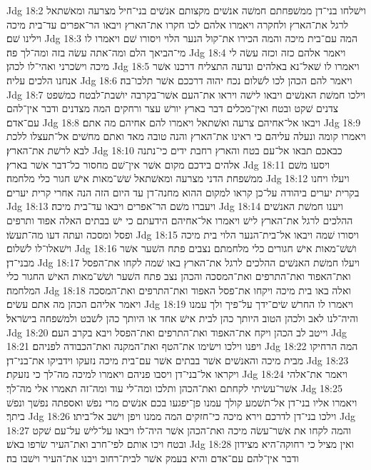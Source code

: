 Jdg 18:2  וישׁלחו בני־דן ממשׁפחתם חמשׁה אנשׁים מקצותם אנשׁים בני־חיל מצרעה ומאשׁתאל לרגל את־הארץ ולחקרה ויאמרו אלהם לכו חקרו את־הארץ ויבאו הר־אפרים עד־בית מיכה וילינו שׁם׃
Jdg 18:3  המה עם־בית מיכה והמה הכירו את־קול הנער הלוי ויסורו שׁם ויאמרו לו מי־הביאך הלם ומה־אתה עשׂה בזה ומה־לך פה׃
Jdg 18:4  ויאמר אלהם כזה וכזה עשׂה לי מיכה וישׂכרני ואהי־לו לכהן׃
Jdg 18:5  ויאמרו לו שׁאל־נא באלהים ונדעה התצליח דרכנו אשׁר אנחנו הלכים עליה׃
Jdg 18:6  ויאמר להם הכהן לכו לשׁלום נכח יהוה דרככם אשׁר תלכו־בה׃
Jdg 18:7  וילכו חמשׁת האנשׁים ויבאו לישׁה ויראו את־העם אשׁר־בקרבה יושׁבת־לבטח כמשׁפט צדנים שׁקט ובטח ואין־מכלים דבר בארץ יורשׁ עצר ורחקים המה מצדנים ודבר אין־להם עם־אדם׃
Jdg 18:8  ויבאו אל־אחיהם צרעה ואשׁתאל ויאמרו להם אחיהם מה אתם׃
Jdg 18:9  ויאמרו קומה ונעלה עליהם כי ראינו את־הארץ והנה טובה מאד ואתם מחשׁים אל־תעצלו ללכת לבא לרשׁת את־הארץ׃
Jdg 18:10  כבאכם תבאו אל־עם בטח והארץ רחבת ידים כי־נתנה אלהים בידכם מקום אשׁר אין־שׁם מחסור כל־דבר אשׁר בארץ׃
Jdg 18:11  ויסעו משׁם ממשׁפחת הדני מצרעה ומאשׁתאל שׁשׁ־מאות אישׁ חגור כלי מלחמה׃
Jdg 18:12  ויעלו ויחנו בקרית יערים ביהודה על־כן קראו למקום ההוא מחנה־דן עד היום הזה הנה אחרי קרית יערים׃
Jdg 18:13  ויעברו משׁם הר־אפרים ויבאו עד־בית מיכה׃
Jdg 18:14  ויענו חמשׁת האנשׁים ההלכים לרגל את־הארץ לישׁ ויאמרו אל־אחיהם הידעתם כי ישׁ בבתים האלה אפוד ותרפים ופסל ומסכה ועתה דעו מה־תעשׂו׃
Jdg 18:15  ויסורו שׁמה ויבאו אל־בית־הנער הלוי בית מיכה וישׁאלו־לו לשׁלום׃
Jdg 18:16  ושׁשׁ־מאות אישׁ חגורים כלי מלחמתם נצבים פתח השׁער אשׁר מבני־דן׃
Jdg 18:17  ויעלו חמשׁת האנשׁים ההלכים לרגל את־הארץ באו שׁמה לקחו את־הפסל ואת־האפוד ואת־התרפים ואת־המסכה והכהן נצב פתח השׁער ושׁשׁ־מאות האישׁ החגור כלי המלחמה׃
Jdg 18:18  ואלה באו בית מיכה ויקחו את־פסל האפוד ואת־התרפים ואת־המסכה ויאמר אליהם הכהן מה אתם עשׂים׃
Jdg 18:19  ויאמרו לו החרשׁ שׂים־ידך על־פיך ולך עמנו והיה־לנו לאב ולכהן הטוב היותך כהן לבית אישׁ אחד או היותך כהן לשׁבט ולמשׁפחה בישׂראל׃
Jdg 18:20  וייטב לב הכהן ויקח את־האפוד ואת־התרפים ואת־הפסל ויבא בקרב העם׃
Jdg 18:21  ויפנו וילכו וישׂימו את־הטף ואת־המקנה ואת־הכבודה לפניהם׃
Jdg 18:22  המה הרחיקו מבית מיכה והאנשׁים אשׁר בבתים אשׁר עם־בית מיכה נזעקו וידביקו את־בני־דן׃
Jdg 18:23  ויקראו אל־בני־דן ויסבו פניהם ויאמרו למיכה מה־לך כי נזעקת׃
Jdg 18:24  ויאמר את־אלהי אשׁר־עשׂיתי לקחתם ואת־הכהן ותלכו ומה־לי עוד ומה־זה תאמרו אלי מה־לך׃
Jdg 18:25  ויאמרו אליו בני־דן אל־תשׁמע קולך עמנו פן־יפגעו בכם אנשׁים מרי נפשׁ ואספתה נפשׁך ונפשׁ ביתך׃
Jdg 18:26  וילכו בני־דן לדרכם וירא מיכה כי־חזקים המה ממנו ויפן וישׁב אל־ביתו׃
Jdg 18:27  והמה לקחו את אשׁר־עשׂה מיכה ואת־הכהן אשׁר היה־לו ויבאו על־לישׁ על־עם שׁקט ובטח ויכו אותם לפי־חרב ואת־העיר שׂרפו באשׁ׃
Jdg 18:28  ואין מציל כי רחוקה־היא מצידון ודבר אין־להם עם־אדם והיא בעמק אשׁר לבית־רחוב ויבנו את־העיר וישׁבו בה׃
